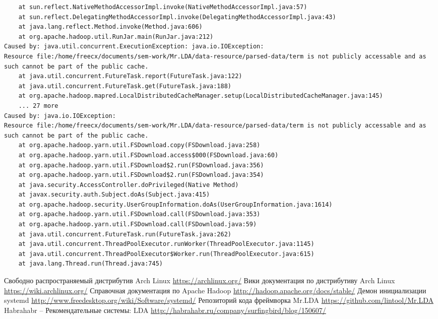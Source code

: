 \begin{verbatim}
    at sun.reflect.NativeMethodAccessorImpl.invoke(NativeMethodAccessorImpl.java:57)
    at sun.reflect.DelegatingMethodAccessorImpl.invoke(DelegatingMethodAccessorImpl.java:43)
    at java.lang.reflect.Method.invoke(Method.java:606)
    at org.apache.hadoop.util.RunJar.main(RunJar.java:212)
Caused by: java.util.concurrent.ExecutionException: java.io.IOException: 
Resource file:/home/freecx/documents/sem-work/Mr.LDA/data-resource/parsed-data/term is not publicly accessable and as such cannot be part of the public cache.
    at java.util.concurrent.FutureTask.report(FutureTask.java:122)
    at java.util.concurrent.FutureTask.get(FutureTask.java:188)
    at org.apache.hadoop.mapred.LocalDistributedCacheManager.setup(LocalDistributedCacheManager.java:145)
    ... 27 more
Caused by: java.io.IOException: 
Resource file:/home/freecx/documents/sem-work/Mr.LDA/data-resource/parsed-data/term is not publicly accessable and as such cannot be part of the public cache.
    at org.apache.hadoop.yarn.util.FSDownload.copy(FSDownload.java:258)
    at org.apache.hadoop.yarn.util.FSDownload.access$000(FSDownload.java:60)
    at org.apache.hadoop.yarn.util.FSDownload$2.run(FSDownload.java:356)
    at org.apache.hadoop.yarn.util.FSDownload$2.run(FSDownload.java:354)
    at java.security.AccessController.doPrivileged(Native Method)
    at javax.security.auth.Subject.doAs(Subject.java:415)
    at org.apache.hadoop.security.UserGroupInformation.doAs(UserGroupInformation.java:1614)
    at org.apache.hadoop.yarn.util.FSDownload.call(FSDownload.java:353)
    at org.apache.hadoop.yarn.util.FSDownload.call(FSDownload.java:59)
    at java.util.concurrent.FutureTask.run(FutureTask.java:262)
    at java.util.concurrent.ThreadPoolExecutor.runWorker(ThreadPoolExecutor.java:1145)
    at java.util.concurrent.ThreadPoolExecutor$Worker.run(ThreadPoolExecutor.java:615)
    at java.lang.Thread.run(Thread.java:745)
\end{verbatim}
\normalsize

\renewcommand{\bibname}{Информационные источники}
\begin{thebibliography}{10}
     Свободно распространяемый дистрибутив Arch Linux \url{https://archlinux.org/}
     Вики документация по дистрибутиву Arch Linux \url{https://wiki.archlinux.org/}
     Справочная документация по Apache Hadoop \url{http://hadoop.apache.org/docs/stable/}
     Демон инициализации systemd \url{http://www.freedesktop.org/wiki/Software/systemd/}
     Репозиторий кода фреймворка Mr.LDA \url{https://github.com/lintool/Mr.LDA}
     Habrahabr -- Рекомендательные системы: LDA \url{http://habrahabr.ru/company/surfingbird/blog/150607/}
\end{thebibliography}
